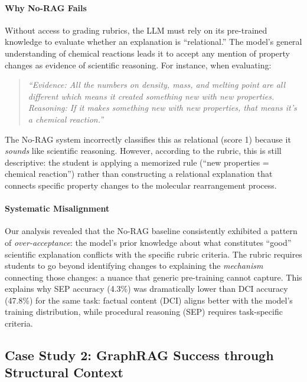 \documentclass{edm_article}
\begin{document}
\paragraph{Why No-RAG Fails}
Without access to grading rubrics, the LLM must rely on its pre-trained knowledge to evaluate whether an explanation is ``relational.'' The model's general understanding of chemical reactions leads it to accept any mention of property changes as evidence of scientific reasoning. For instance, when evaluating:

\begin{quote}
\vspace{-12pt}
\textit{``Evidence: All the numbers on density, mass, and melting point are all different which means it created something new with new properties.}\\
\textit{Reasoning: If it makes something new with new properties, that means it's a chemical reaction.''}
\vspace{-12pt}
\end{quote}

The No-RAG system incorrectly classifies this as relational (score 1) because it \textit{sounds} like scientific reasoning. However, according to the rubric, this is still descriptive: the student is applying a memorized rule (``new properties = chemical reaction'') rather than constructing a relational explanation that connects specific property changes to the molecular rearrangement process.

\paragraph{Systematic Misalignment}
Our analysis revealed that the No-RAG baseline consistently exhibited a pattern of \textit{over-acceptance}: the model's prior knowledge about what constitutes ``good'' scientific explanation conflicts with the specific rubric criteria. The rubric requires students to go beyond identifying changes to explaining the \textit{mechanism} connecting those changes: a nuance that generic pre-training cannot capture. This explains why SEP accuracy (4.3\%) was dramatically lower than DCI accuracy (47.8\%) for the same task: factual content (DCI) aligns better with the model's training distribution, while procedural reasoning (SEP) requires task-specific criteria.


\subsection{Case Study 2: GraphRAG Success through Structural Context}
\end{document}
